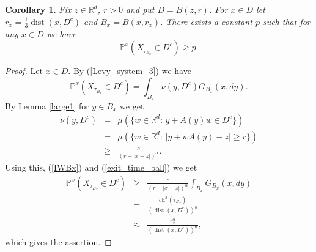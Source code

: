 \documentclass[a4paper,12pt,reqno]{amsart}
\newtheorem{corollary}[theorem]{Corollary}
\theoremstyle{definition}
\theoremstyle{remark}
\newcommand{\Ee}{\mathds{E}} %
\newcommand{\Pp}{\mathds{P}} %
\newcommand{\R}{\mathds{R}}
\DeclareMathOperator{\dist}{dist}
\begin{document}
\begin{corollary}
\label{Bxp}
Fix $z \in \R^d$, $r > 0$ and put $D = B(z,r)$. For $x \in D$ let $r_x = \frac{1}{3}\dist(x,D^c)$ and $B_x = B(x,r_x)$. There exists a constant $p$ such that for any $x \in D$ we have
$$
\Pp^x(X_{\tau_{B_x}} \in D^c) \ge p.
$$ 
\end{corollary}
\begin{proof}
Let $x \in D$. By (\ref{Levy_system_3}) we have
\begin{equation}
\label{IWBx}
\Pp^x(X_{\tau_{B_x}} \in D^c) = \int_{B_x} \nu(y,D^c) G_{B_x}(x,dy).
\end{equation}
By Lemma \ref{large1} for $y \in B_x$ we get
\begin{eqnarray*}
\nu(y,D^c) &=& \mu(\{w \in \R^d: \, y + A(y) w \in D^c\})\\
&=& \mu(\{w \in \R^d: \, |y + w A(y) - z| \ge r\})\\
&\ge& \frac{c}{(r - |x - z|)^{\alpha}}.
\end{eqnarray*}
Using this, (\ref{IWBx}) and (\ref{exit_time_ball}) we get
\begin{eqnarray*}
\Pp^x(X_{\tau_{B_x}} \in D^c) &\ge& 
\frac{c}{(r - |x - z|)^{\alpha}} \int_{B_x} G_{B_x}(x,dy)\\
&=& \frac{c \Ee^x(\tau_{B_x})}{(\dist(x,D^c))^{\alpha}}\\
&\approx& \frac{r_x^{\alpha}}{(\dist(x,D^c))^{\alpha}},
\end{eqnarray*}
which gives the assertion.
\end{proof}
\end{document}
